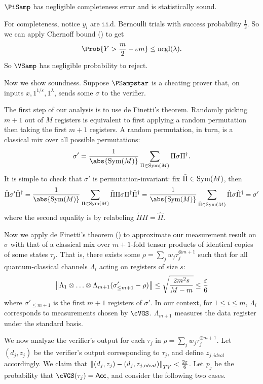\begin{thm}
    \label{QPIP1thm}
	$\PiSamp$ has negligible completeness error and is statistically sound. 
\end{thm}
\begin{prf}
	For completeness, notice $y_i$ are i.i.d. Bernoulli trials with success probability $\frac{1}{2}$.
	So we can apply Chernoff bound () to get
	$$\Prob{Y>\frac{m}{2}-\varepsilon m}\leq\negl(\lambda).$$
	So $\VSamp$ has negligible probability to reject.
	
	Now we show soundness.
	Suppose $\PSampstar$ is a cheating prover that, on inputs $x, 1^{1/\varepsilon}, 1^\lambda$, sends some $\sigma$ to the verifier.

	The first step of our analysis is to use de Finetti's theorem.
	Randomly picking $m+1$ out of $M$ registers is equivalent to first applying a random permutation then taking the first $m+1$ registers.
	A random permutation, in turn, is a classical mix over all possible permutations:
	$$\sigma'=\frac{1}{\abs{\Sym(M)}}\sum_{\Pi\in\Sym(M)}\Pi\sigma\Pi^\dagger.$$
	It is simple to check that $\sigma'$ is permutation-invariant:
	fix $\tilde{\Pi}\in\operatorname{Sym}(M)$, then
	$$\tilde{\Pi}\sigma'\tilde{\Pi}^\dagger
	=\frac{1}{\abs{\Sym(M)}}\sum_{\Pi\in\Sym(M)}\tilde{\Pi}\Pi\sigma\Pi^\dagger\tilde{\Pi}^\dagger
	=\frac{1}{\abs{\Sym(M)}}\sum_{\hat{\Pi}\in\Sym(M)}\hat{\Pi}\sigma\hat{\Pi}^\dagger
	=\sigma'$$
	where the second equality is by relabeling $\tilde{\Pi}\Pi=\hat{\Pi}$.

	Now we apply de Finetti's theorem () to approximate our measurement result on $\sigma$ with that of a classical mix over $m+1$-fold tensor products of identical copies of some states $\tau_j$.
	That is, there exists some $\rho=\sum_j w_j\tau_j^{\otimes m+1}$
	such that for all quantum-classical channels $\Lambda_i$ acting on registers of size $s$:
	$$\left\lVert\Lambda_1\otimes\ldots\otimes\Lambda_{m+1}(\sigma'_{\leq m+1}-\rho)\right\rVert
	\leq\sqrt{\frac{2m^2s}{M-m}}
	\leq\frac{\varepsilon}{6}$$
	where $\sigma'_{\leq m+1}$ is the first $m+1$ registers of $\sigma'$.
	In our context, for $1\leq i\leq m$, $\Lambda_i$ corresponds to measurements chosen by $\cVGS$.
	$\Lambda_{m+1}$ measures the data register under the standard basis.
	
	We now analyze the verifier's output for each $\tau_j$ in $\rho=\sum_j w_j\tau_j^{\otimes m+1}$. Let $(d_j, z_j)$ be the verifier's output corresponding to $\tau_j$, and define $z_{j, ideal}$ accordingly.
	We claim that $\left\lVert(d_j, z_j)-(d_j, z_{j, ideal})\right\rVert_{TV}<\frac{2\varepsilon}{6}$.
	Let $p_j$ be the probability that $\cVGS(\tau_j)=\Acc$, and consider the following two cases.


\end{prf}
